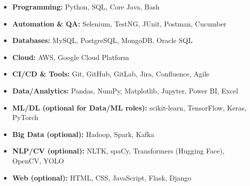 \begin{itemize}
  \item \textbf{Programming:} Python, SQL, Core Java, Bash
  \item \textbf{Automation \& QA:} Selenium, TestNG, JUnit, Postman, Cucumber
  \item \textbf{Databases:} MySQL, PostgreSQL, MongoDB, Oracle SQL
  \item \textbf{Cloud:} AWS, Google Cloud Platform
  \item \textbf{CI/CD \& Tools:} Git, GitHub, GitLab, Jira, Confluence, Agile
  \item \textbf{Data/Analytics:} Pandas, NumPy, Matplotlib, Jupyter, Power BI, Excel
  \item \textbf{ML/DL (optional for Data/ML roles):} scikit-learn, TensorFlow, Keras, PyTorch
  \item \textbf{Big Data (optional):} Hadoop, Spark, Kafka
  \item \textbf{NLP/CV (optional):} NLTK, spaCy, Transformers (Hugging Face), OpenCV, YOLO
  \item \textbf{Web (optional):} HTML, CSS, JavaScript, Flask, Django
\end{itemize}
